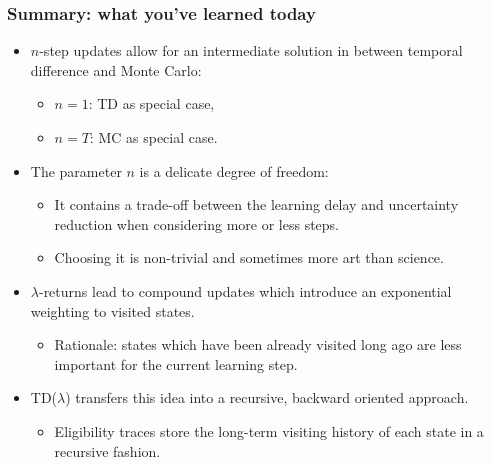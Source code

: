 \begin{frame}
\frametitle{Summary: what you've learned today}
\begin{itemize}
	\item $n$-step updates allow for an intermediate solution in between temporal difference and Monte Carlo:
	\begin{itemize}
		\item $n=1$: TD as special case,
		\item $n=T$: MC as special case.
	\end{itemize}\pause
	\item The parameter $n$ is a delicate degree of freedom:
	\begin{itemize}
		\item It contains a trade-off between the learning delay and uncertainty reduction when considering more or less steps.
		\item Choosing it is non-trivial and sometimes more art than science.
	\end{itemize}
	\item $\lambda$-returns lead to compound updates which introduce an exponential weighting to visited states.
	\begin{itemize}
		\item Rationale: states which have been already visited long ago are less important for the current learning step.
	\end{itemize}
	\item TD($\lambda$) transfers this idea into a recursive, backward oriented approach.
	\begin{itemize}
		\item Eligibility traces store the long-term visiting history of each state in a recursive fashion.
	\end{itemize}
\end{itemize}
\end{frame}